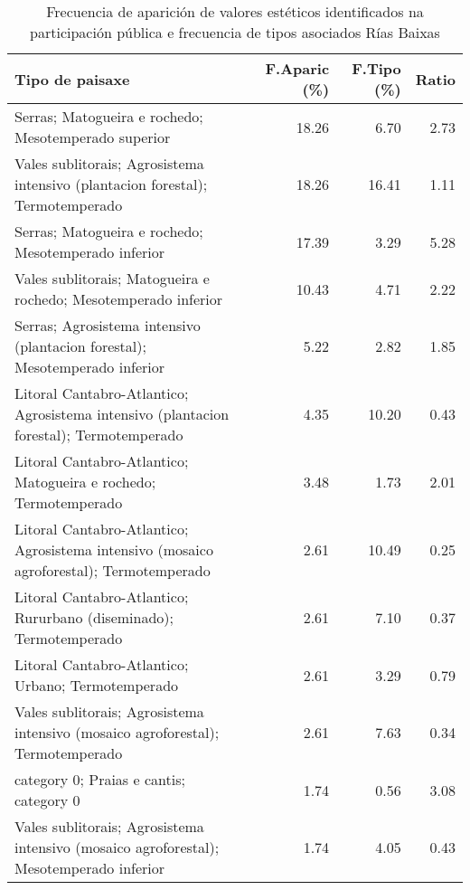 \begin{table}[p]
\centering
\caption{Frecuencia de aparición de valores estéticos identificados na participación pública e frecuencia de tipos asociados Rías Baixas} 
\label{vsixotest12}
\begin{tabular}{lrrr}
  \hline
Tipo de paisaxe & F.Aparic (\%) & F.Tipo (\%) & Ratio \\ 
  \hline
Serras; Matogueira e rochedo; Mesotemperado superior & 18.26 & 6.70 & 2.73 \\ 
  Vales sublitorais; Agrosistema intensivo (plantacion forestal); Termotemperado & 18.26 & 16.41 & 1.11 \\ 
  Serras; Matogueira e rochedo; Mesotemperado inferior & 17.39 & 3.29 & 5.28 \\ 
  Vales sublitorais; Matogueira e rochedo; Mesotemperado inferior & 10.43 & 4.71 & 2.22 \\ 
  Serras; Agrosistema intensivo (plantacion forestal); Mesotemperado inferior & 5.22 & 2.82 & 1.85 \\ 
  Litoral Cantabro-Atlantico; Agrosistema intensivo (plantacion forestal); Termotemperado & 4.35 & 10.20 & 0.43 \\ 
  Litoral Cantabro-Atlantico; Matogueira e rochedo; Termotemperado & 3.48 & 1.73 & 2.01 \\ 
  Litoral Cantabro-Atlantico; Agrosistema intensivo (mosaico agroforestal); Termotemperado & 2.61 & 10.49 & 0.25 \\ 
  Litoral Cantabro-Atlantico; Rururbano (diseminado); Termotemperado & 2.61 & 7.10 & 0.37 \\ 
  Litoral Cantabro-Atlantico; Urbano; Termotemperado & 2.61 & 3.29 & 0.79 \\ 
  Vales sublitorais; Agrosistema intensivo (mosaico agroforestal); Termotemperado & 2.61 & 7.63 & 0.34 \\ 
  category 0; Praias e cantis; category 0 & 1.74 & 0.56 & 3.08 \\ 
  Vales sublitorais; Agrosistema intensivo (mosaico agroforestal); Mesotemperado inferior & 1.74 & 4.05 & 0.43 \\ 
   \hline
\end{tabular}
\end{table}
